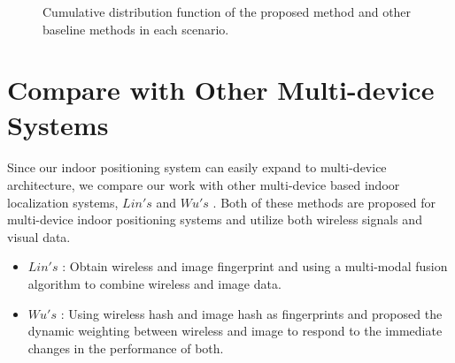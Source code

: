 \documentclass[a4paper,12pt]{report}
\begin{document}
\begin{figure}[htbp]
    \caption{Cumulative distribution function of the proposed method and other baseline methods in each scenario.}
    \label{Fig:cdf_baseline}
\end{figure}
\section{Compare with Other Multi-device Systems}
\paragraph{}
Since our indoor positioning system can easily expand to multi-device architecture, we compare our work with other multi-device based indoor localization systems, $Lin's$ \cite{Lin2021} and $Wu's$ \cite{Wu2022}. Both of these methods are proposed for multi-device indoor positioning systems and utilize both wireless signals and visual data.
\begin{itemize}
    \item $Lin's$ \cite{Lin2021}: Obtain wireless and image fingerprint and using a multi-modal fusion algorithm to combine wireless and image data.
    \item $Wu's$ \cite{Wu2022}: Using wireless hash and image hash as fingerprints and proposed the dynamic weighting between wireless and image to respond to the immediate changes in the performance of both.
\end{itemize}
\end{document}
